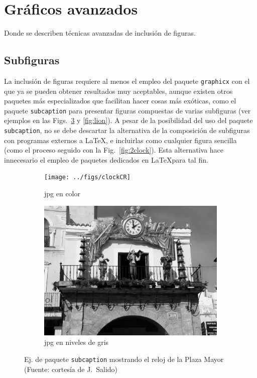 \documentclass[11pt,a4paper]{article}
\begin{document}
\section{Gráficos avanzados}
Donde se describen técnicas avanzadas de inclusión de figuras.

\subsection{Subfiguras}
La inclusión de figuras requiere al menos el empleo del paquete \texttt{graphicx} con el que ya se pueden obtener resultados muy aceptables, aunque existen otros paquetes más especializados que facilitan hacer cosas más exóticas, como el paquete \texttt{subcaption} para presentar figuras compuestas de varias subfiguras (ver ejemplos en las Figs.~\ref{fig:clock} y \ref{fig:lion}). A pesar de la posibilidad del uso del paquete \texttt{subcaption}, no se debe descartar la alternativa de la composición de subfiguras con programas externos a \LaTeX{}, e incluirlas como cualquier figura sencilla (como el proceso seguido con la Fig.~\ref{fig:2clock}). Esta alternativa hace innecesario el empleo de paquetes dedicados en \LaTeX para tal fin.

\begin{figure}[H]
	\centering
	\begin{subfigure}[b]{0.35\textwidth}
		\centering
		\texttt{[image: ../figs/clockCR]}
		\caption{jpg en color}\label{fig:clockCR}
	\end{subfigure}
	\begin{subfigure}[b]{0.35\textwidth}
		\centering
		\includegraphics[width=\textwidth]{../figs/clockCRbw}
		\caption{jpg en niveles de gris}\label{fig:clockCRbw}
	\end{subfigure}
	\caption[Comparación jpg color y niveles de gris]{Ej. de paquete \texttt{subcaption} mostrando el reloj de la Plaza Mayor (Fuente: cortesía de J.~Salido)}
	\label{fig:clock}
\end{figure}
\end{document}
